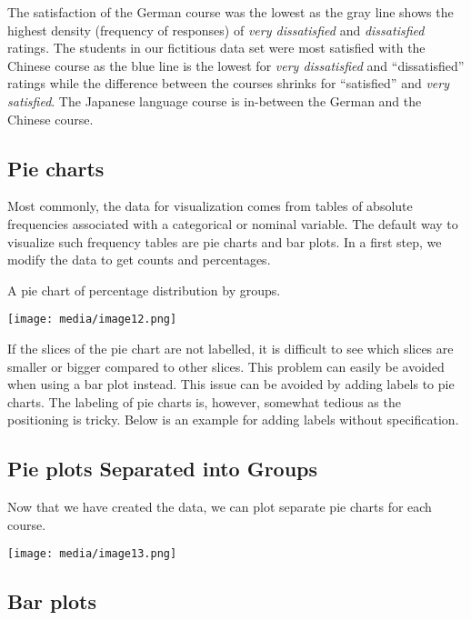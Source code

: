 The satisfaction of the German course was the lowest as the gray line
shows the highest density (frequency of responses) of \emph{very
dissatisfied} and \emph{dissatisfied} ratings. The students in our
fictitious data set were most satisfied with the Chinese course as the
blue line is the lowest for \emph{very dissatisfied} and
``dissatisfied'' ratings while the difference between the courses
shrinks for ``satisfied'' and \emph{very satisfied}. The Japanese
language course is in-between the German and the Chinese course.

\hypertarget{pie-charts}{%
\subsection{Pie charts}\label{pie-charts}}

Most commonly, the data for visualization comes from tables of absolute
frequencies associated with a categorical or nominal variable. The
default way to visualize such frequency tables are pie charts and bar
plots. In a first step, we modify the data to get counts and
percentages.

A pie chart of percentage distribution by groups.

\texttt{[image: media/image12.png]}

If the slices of the pie chart are not labelled, it is difficult to see
which slices are smaller or bigger compared to other slices. This
problem can easily be avoided when using a bar plot instead. This issue
can be avoided by adding labels to pie charts. The labeling of pie
charts is, however, somewhat tedious as the positioning is tricky. Below
is an example for adding labels without specification.

\hypertarget{pie-plots-separated-into-groups}{%
\subsection{Pie plots Separated into
Groups}\label{pie-plots-separated-into-groups}}

Now that we have created the data, we can plot separate pie charts for
each course.

\texttt{[image: media/image13.png]}

\hypertarget{bar-plots}{%
\subsection{Bar plots}\label{bar-plots}}

